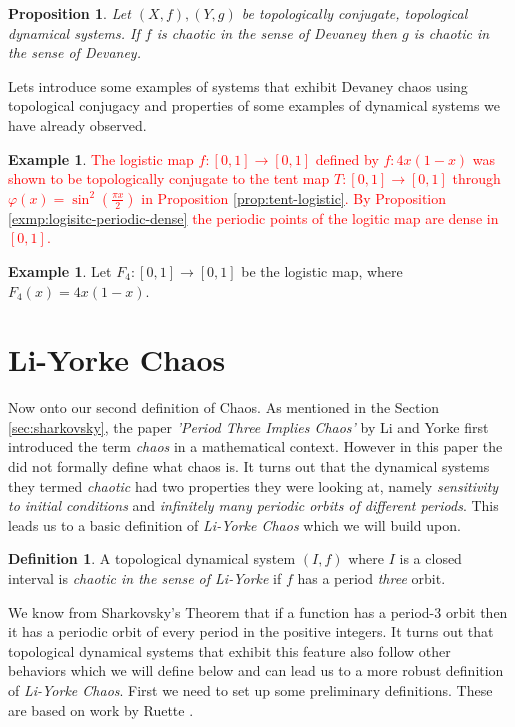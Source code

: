 \documentclass[11pt,a4paper,oneside]{memoir}
\theoremstyle{plain}
\newtheorem{prop}[thm]{Proposition}
\theoremstyle{definition}
\newtheorem{defn}[thm]{Definition}
\newtheorem{exmp}[thm]{Example}
\begin{document}
\begin{prop}
    Let $(X, f), (Y, g)$ be topologically conjugate, topological dynamical systems. If $f$ is chaotic in the sense of Devaney then $g$ is chaotic in the sense of Devaney.
\end{prop}

Lets introduce some examples of systems that exhibit Devaney chaos using topological conjugacy and properties of some examples of dynamical systems we have already observed.

\begin{exmp}
    \textcolor{red}{The logistic map $f: [0, 1] \to [0, 1]$ defined by $f: 4x (1-x)$ was shown to be topologically conjugate to the tent map $T: [0, 1] \to [0, 1]$ through $\varphi(x) = \sin^2(\frac{\pi x}{2})$ in Proposition \ref{prop:tent-logistic}. By Proposition \ref{exmp:logisitc-periodic-dense} the periodic points of the logitic map are dense in $[0,1]$. }
\end{exmp}

\begin{exmp}
    Let $F_4: [0, 1] \to [0,1]$ be the logistic map, where $F_4(x) = 4x(1-x)$.
\end{exmp}

\section{Li-Yorke Chaos}

Now onto our second definition of Chaos. As mentioned in the Section \ref{sec:sharkovsky}, the paper \emph{'Period Three Implies Chaos'} by Li and Yorke \cite{li-yorke} first introduced the term \emph{chaos} in a mathematical context. However in this paper the did not formally define what chaos is. It turns out that the dynamical systems they termed \emph{chaotic} had two properties they were looking at, namely \emph{sensitivity to initial conditions} and \emph{infinitely many periodic orbits of different periods}. This leads us to a basic definition of \emph{Li-Yorke Chaos} which we will build upon.

\begin{defn}
    A topological dynamical system $(I, f)$ where $I$ is a closed interval is \emph{chaotic in the sense of Li-Yorke} if $f$ has a period \emph{three} orbit.
\end{defn}

We know from Sharkovsky's Theorem that if a function has a period-3 orbit then it has a periodic orbit of every period in the positive integers. It turns out that topological dynamical systems that exhibit this feature also follow other behaviors which we will define below and can lead us to a more robust definition of \emph{Li-Yorke Chaos}. First we need to set up some preliminary definitions. These are based on work by Ruette \cite[Section 5.1]{ruette}.
\end{document}
